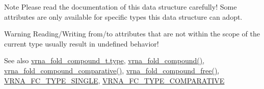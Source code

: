 \begin{DoxyNote}{Note}
Please read the documentation of this data structure carefully! Some attributes are only available for specific types this data structure can adopt.
\end{DoxyNote}
\begin{DoxyWarning}{Warning}
Reading/\+Writing from/to attributes that are not within the scope of the current type usually result in undefined behavior!
\end{DoxyWarning}
\begin{DoxySeeAlso}{See also}
\mbox{\hyperlink{group__fold__compound_ac5eab693deac9a1a40c2a95ac294707c}{vrna\+\_\+fold\+\_\+compound\+\_\+t.\+type}}, \mbox{\hyperlink{group__fold__compound_ga6601d994ba32b11511b36f68b08403be}{vrna\+\_\+fold\+\_\+compound()}}, \mbox{\hyperlink{group__fold__compound_gad6bacc816af274922b13d947f708aa0c}{vrna\+\_\+fold\+\_\+compound\+\_\+comparative()}}, \mbox{\hyperlink{group__fold__compound_gadded6039d63f5d6509836e20321534ad}{vrna\+\_\+fold\+\_\+compound\+\_\+free()}}, \mbox{\hyperlink{group__fold__compound_gga01a4ff86fa71deaaa5d1abbd95a1447da7e264dd3cf2dc9b6448caabcb7763cd6}{V\+R\+N\+A\+\_\+\+F\+C\+\_\+\+T\+Y\+P\+E\+\_\+\+S\+I\+N\+G\+LE}}, \mbox{\hyperlink{group__fold__compound_gga01a4ff86fa71deaaa5d1abbd95a1447dab821ce46ea3cf665be97df22a76f5023}{V\+R\+N\+A\+\_\+\+F\+C\+\_\+\+T\+Y\+P\+E\+\_\+\+C\+O\+M\+P\+A\+R\+A\+T\+I\+VE}}
\end{DoxySeeAlso}
